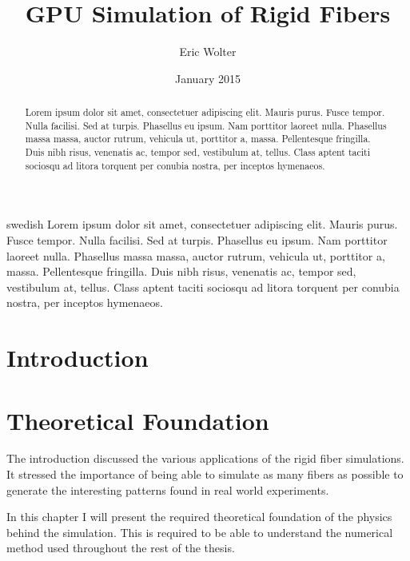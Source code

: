 \documentclass[a4paper,11pt]{kth-mag}
\title{GPU Simulation of Rigid Fibers}
\author{Eric Wolter}
\date{January 2015}
\begin{document}
\frontmatter
\pagestyle{empty}

\maketitle
{}
\begin{abstract}
Lorem ipsum dolor sit amet, consectetuer adipiscing elit. Mauris
purus. Fusce tempor. Nulla facilisi. Sed at turpis. Phasellus eu
ipsum. Nam porttitor laoreet nulla. Phasellus massa massa, auctor
rutrum, vehicula ut, porttitor a, massa. Pellentesque fringilla. Duis
nibh risus, venenatis ac, tempor sed, vestibulum at, tellus. Class
aptent taciti sociosqu ad litora torquent per conubia nostra, per
inceptos hymenaeos.
\end{abstract}

\clearpage


\begin{foreignabstract}{swedish}
Lorem ipsum dolor sit amet, consectetuer adipiscing elit. Mauris
purus. Fusce tempor. Nulla facilisi. Sed at turpis. Phasellus eu
ipsum. Nam porttitor laoreet nulla. Phasellus massa massa, auctor
rutrum, vehicula ut, porttitor a, massa. Pellentesque fringilla. Duis
nibh risus, venenatis ac, tempor sed, vestibulum at, tellus. Class
aptent taciti sociosqu ad litora torquent per conubia nostra, per
inceptos hymenaeos.
\end{foreignabstract}

\clearpage

\tableofcontents*

\clearpage

\listoflistings

\mainmatter
\pagestyle{newchap}

\chapter{Introduction}

\chapter{Theoretical Foundation}
\label{cha:theoretical_foundation}
The introduction discussed the various applications of the rigid fiber simulations. It stressed the importance of being able to simulate as many fibers as possible to generate the interesting patterns found in real world experiments.

In this chapter I will present the required theoretical foundation of the physics behind the simulation. This is required to be able to understand the numerical method used throughout the rest of the thesis.
\end{document}
